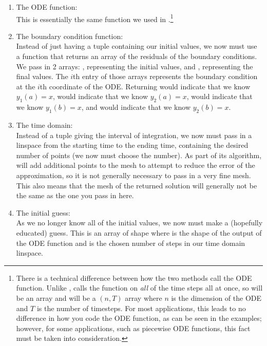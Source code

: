 \begin{enumerate}
    \item The ODE function: \\
    This is essentially the same function we used in .\footnote{There is a technical difference between how the two methods call the ODE function. Unlike ,  calls the function on \emph{all} of the time steps all at once, so  will be an array and  will be a \((n,T)\) array where \(n\) is the dimension of the ODE and \(T\) is the number of timesteps. For most applications, this leads to no difference in how you code the ODE function, as can be seen in the examples; however, for some applications, such as piecewise ODE functions, this fact must be taken into consideration.}
    \item The boundary condition function: \\
    Instead of just having a tuple containing our initial values, we now must use a function that returns an array of the residuals of the boundary conditions. 
    We pass in 2 arrays: , representing the initial values, and , representing the final values. The \(i\)th entry of those arrays represents the boundary condition at the \(i\)th coordinate of the ODE.
    Returning  would indicate that we know \(y_1(a)=x\),  would indicate that we know \(y_2(a)=x\),  would indicate that we know \(y_1(b)=x\), and  would indicate that we know \(y_2(b)=x\).
    \item The time domain: \\
    Instead of a tuple giving the interval of integration, we now must pass in a linspace from the starting time to the ending time, containing the desired number of points (we now must choose the number).
    As part of its algorithm,  will add additional points to the mesh to attempt to reduce the error of the approximation, so it is not generally necessary to pass in a very fine mesh.
    This also means that the mesh of the returned solution will generally not be the same as the one you pass in here.
    \item The initial guess: \\
    As we no longer know all of the initial values, we now must make a (hopefully educated) guess. This is an array of shape  where  is the shape of the output of the ODE function and  is the chosen number of steps in our time domain linspace. 
\end{enumerate}


